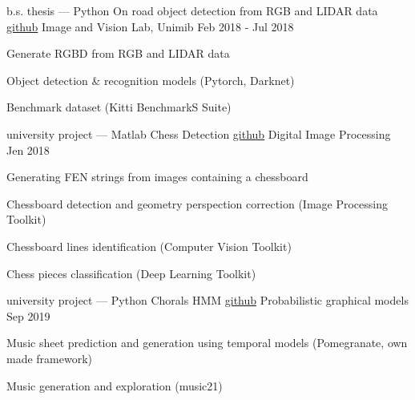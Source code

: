 

\begin{cventries}

  \cventry
    {b.s. thesis --- Python} %
    {On road object detection from RGB and LIDAR data \tiny \href{https://github.com/gianscarpe/bachelor_thesis}{github}} %
    {Image and Vision Lab, Unimib} %
    {Feb 2018 - Jul 2018} %
    {
      \begin{cvitems} %
		\item Generate RGBD from RGB and LIDAR data
		\item Object detection \& recognition models (Pytorch, Darknet)
		\item Benchmark dataset (Kitti BenchmarkS Suite)
      \end{cvitems}
    }

\cventry
    {university project --- Matlab}
    {Chess Detection \tiny \href{https://github.com/gianscarpe/chess_detection}{github}}
    {Digital Image Processing}
    {Jen 2018}
    {
      \begin{cvitems} %
        \item Generating FEN strings from images containing a chessboard
        \item Chessboard detection and geometry perspection correction (Image Processing Toolkit)
        \item Chessboard lines identification (Computer Vision Toolkit)
        \item Chess pieces classification (Deep Learning Toolkit)
      \end{cvitems}
    }
    
\cventry
    {university project --- Python}
    {Chorals HMM  \tiny \href{https://github.com/gianscarpe/chorals_hmm}{github}}
    {Probabilistic graphical models}
    {Sep 2019}
    {
      \begin{cvitems} %
		\item Music sheet prediction and generation using temporal models (Pomegranate, own made framework)
		\item Music generation and exploration (music21)
      \end{cvitems}
    }
    
\end{cventries}


